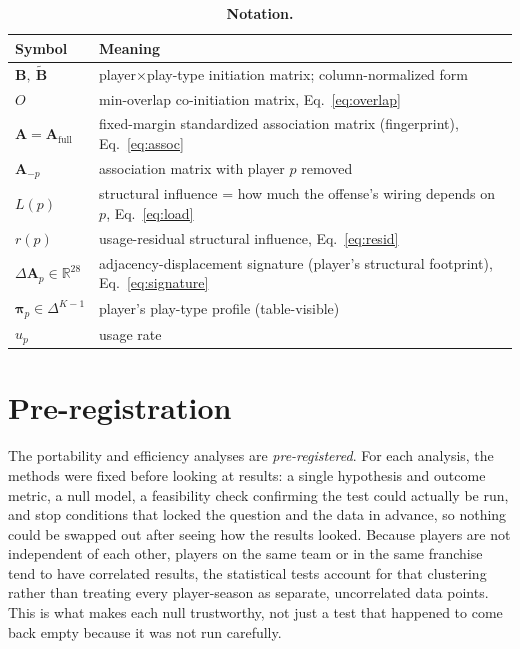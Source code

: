 \documentclass[11pt]{article}
\newcommand{\Bmat}{\ensuremath{\bm{B}}} %
\newcommand{\Amat}{\ensuremath{\bm{A}}} %
\newcommand{\Afull}{\ensuremath{\Amat_{\text{full}}}}
\newcommand{\Aminus}[1]{\ensuremath{\Amat_{-#1}}}
\newcommand{\load}{\ensuremath{L}} %
\newcommand{\resid}{\ensuremath{r}} %
\newcommand{\dA}{\ensuremath{\Delta\Amat}} %
\newcommand{\pt}{\ensuremath{\bm{\pi}}} %
\begin{document}
\begin{table}[t]
\centering\small
\caption{\textbf{Notation.}}
\label{tab:notation}
\begin{tabular}{ll}
\toprule
Symbol & Meaning \\
\midrule
$\Bmat,\ \tilde{\Bmat}$ & player$\times$play-type initiation matrix; column-normalized form \\
$O$ & min-overlap co-initiation matrix, Eq.~\eqref{eq:overlap} \\
$\Amat=\Afull$ & fixed-margin standardized association matrix (fingerprint), Eq.~\eqref{eq:assoc} \\
$\Aminus{p}$ & association matrix with player $p$ removed \\
$\load(p)$ & structural influence = how much the offense's wiring depends on $p$, Eq.~\eqref{eq:load} \\
$\resid(p)$ & usage-residual structural influence, Eq.~\eqref{eq:resid} \\
$\dA_p\in\mathbb{R}^{28}$ & adjacency-displacement signature (player's structural footprint), Eq.~\eqref{eq:signature} \\
$\pt_p\in\Delta^{K-1}$ & player's play-type profile (table-visible) \\
$u_p$ & usage rate \\
\bottomrule
\end{tabular}
\end{table}

\section{Pre-registration}
\label{sec:pipeline}

The portability and efficiency analyses are \emph{pre-registered}. For each analysis, the
methods were fixed before looking at results: a single hypothesis and outcome metric, a null
model, a feasibility check confirming the test could actually be run, and stop conditions
that locked the question and the data in advance, so nothing could be swapped out after
seeing how the results looked. Because players are not independent of each other, players on
the same team or in the same franchise tend to have correlated results, the statistical tests
account for that clustering rather than treating every player-season as separate,
uncorrelated data points. This is what makes each null trustworthy, not just a test that
happened to come back empty because it was not run carefully.
\end{document}
